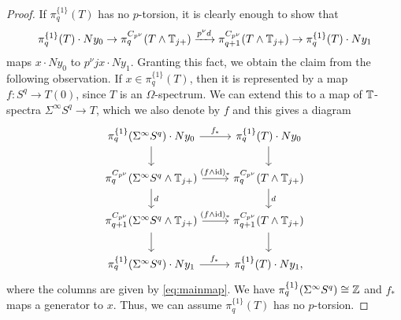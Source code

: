 \begin{proof}
If $\pi^{\{1\}}_q(T)$ has no $p$-torsion, it is clearly enough to show that
\begin{equation}\label{eq:mainmaptorsion}
\pi^{\{1\}}_q(T)\cdot Ny_0 \to\pi^{C_{p^\nu}}_q(T\wedge\mathbb{T}_{j+})\xrightarrow{p^\nu d} 
\pi^{C_{p^\nu}}_{q+1}(T\wedge\mathbb{T}_{j+})\rightarrow  \pi_q^{\{1\}}(T)\cdot Ny_1
\end{equation}
maps $x\cdot Ny_0$ to $p^\nu jx\cdot Ny_1$. Granting this fact,
we obtain the claim from the following observation. If $x\in \pi^{\{1\}}_q(T)$, then it
is represented by a map $f:S^q\to T(0)$, since $T$ is an $\Omega$-spectrum.
We can extend this to a map of $\mathbb{T}$-spectra $\Sigma^\infty S^q\to T$,
which we also denote by $f$ and this
gives a diagram
\begin{equation}\label{eq:spherespectrumtorsion}
\begin{tikzcd}
\pi_q^{\{1\}}(\Sigma^\infty S^q)\cdot Ny_0
\arrow{d}\arrow{r}{f_\ast}
&\pi^{\{1\}}_q(T)\cdot Ny_0
\arrow{d}\\
\pi_q^{C_{p^\nu}}(\Sigma^\infty S^q\wedge \TT_{j+})
\arrow{r}{(f\wedge \mathrm{id})_\ast}\arrow{d}{d}
&\pi^{C_{p^\nu}}_q(T\wedge\TT_{j+})
\arrow{d}{d}\\
\pi_{q+1}^{C_{p^\nu}}(\Sigma^\infty S^q\wedge \TT_{j+})
\arrow{r}{(f\wedge \mathrm{id})_\ast}\arrow{d}
&\pi^{C_{p^\nu}}_{q+1}(T\wedge\TT_{j+})
\arrow{d}\\
\pi_q^{\{1\}}(\Sigma^\infty S^q)\cdot Ny_1
\arrow{r}{f_\ast}
&\pi_q^{\{1\}}(T)\cdot Ny_1,
\end{tikzcd}
\end{equation}
%
where the columns are given by \eqref{eq:mainmap}. We have 
$\pi_q^{\{1\}}(\Sigma^\infty S^q)\cong \mathbb{Z}$ and 
$f_\ast$ maps a generator to $x$. Thus, we can assume $\pi^{\{1\}}_q(T)$ has no $p$-torsion.


\end{proof}
